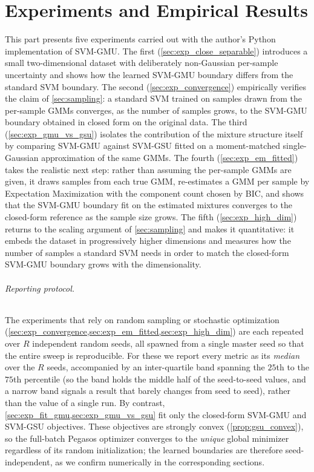 \documentclass[11pt, letterpaper]{article}
\begin{document}
\part{Experiments and Empirical Results}\label{part:experiments}

This part presents five experiments carried out with the author's Python implementation of SVM-GMU. The first (\cref{sec:exp_close_separable}) introduces a small two-dimensional dataset with deliberately non-Gaussian per-sample uncertainty and shows how the learned SVM-GMU boundary differs from the standard SVM boundary. The second (\cref{sec:exp_convergence}) empirically verifies the claim of \cref{sec:sampling}: a standard SVM trained on samples drawn from the per-sample GMMs converges, as the number of samples grows, to the SVM-GMU boundary obtained in closed form on the original data. The third (\cref{sec:exp_gmu_vs_gsu}) isolates the contribution of the mixture structure itself by comparing SVM-GMU against SVM-GSU fitted on a moment-matched single-Gaussian approximation of the same GMMs. The fourth (\cref{sec:exp_em_fitted}) takes the realistic next step: rather than assuming the per-sample GMMs are given, it draws samples from each true GMM, re-estimates a GMM per sample by Expectation Maximization with the component count chosen by BIC, and shows that the SVM-GMU boundary fit on the estimated mixtures converges to the closed-form reference as the sample size grows. The fifth (\cref{sec:exp_high_dim}) returns to the scaling argument of \cref{sec:sampling} and makes it quantitative: it embeds the dataset in progressively higher dimensions and measures how the number of samples a standard SVM needs in order to match the closed-form SVM-GMU boundary grows with the dimensionality.

\paragraph{Reporting protocol.} The experiments that rely on random sampling or stochastic optimization (\cref{sec:exp_convergence,sec:exp_em_fitted,sec:exp_high_dim}) are each repeated over $R$ independent random seeds, all spawned from a single master seed so that the entire sweep is reproducible. For these we report every metric as its \emph{median} over the $R$ seeds, accompanied by an inter-quartile band spanning the $25$th to the $75$th percentile (so the band holds the middle half of the seed-to-seed values, and a narrow band signals a result that barely changes from seed to seed), rather than the value of a single run. By contrast, \cref{sec:exp_fit_gmu,sec:exp_gmu_vs_gsu} fit only the closed-form SVM-GMU and SVM-GSU objectives. These objectives are strongly convex (\cref{prop:gsu_convex}), so the full-batch Pegasos optimizer converges to the \emph{unique} global minimizer regardless of its random initialization; the learned boundaries are therefore seed-independent, as we confirm numerically in the corresponding sections.
\end{document}
